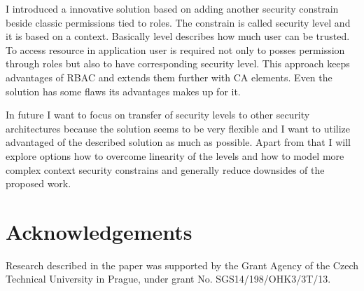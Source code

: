 \documentclass{poster15}
\begin{document}
I introduced a innovative solution based on adding another security constrain beside classic permissions tied to roles. The constrain is called security level and it is based on a context. Basically level describes how much user can be trusted. To access resource in application user is required not only to posses permission through roles but also to have corresponding security level. This approach keeps advantages of RBAC and extends them further with CA elements. Even the solution has some flaws its advantages makes up for it. 

In future I want to focus on transfer of security levels to other security architectures because the solution seems to be very flexible and I want to utilize advantaged of the described solution as much as possible. Apart from that I will explore options how to overcome linearity of the levels and how to model more complex context security constrains and generally reduce downsides of the proposed work.

\section*{Acknowledgements}
Research described in the paper was supported by the
Grant Agency of the Czech Technical University in Prague, under grant No. SGS14/198/OHK3/3T/13.
\end{document}
